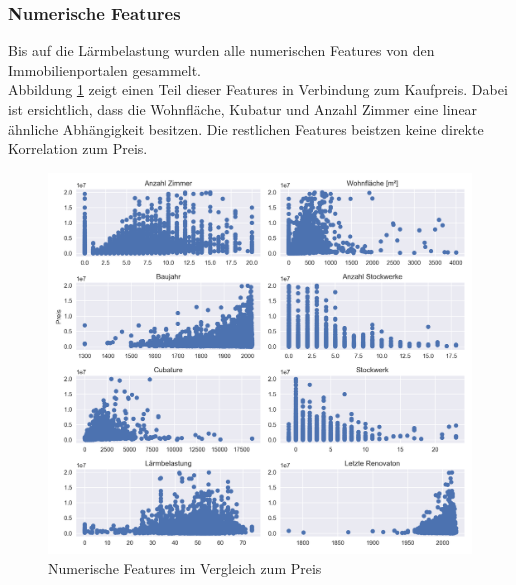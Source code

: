 \begin{table}[ht]
\centering
{}
\caption{Statistische Werte des Kaufpreises}
\label{tab:price}
\end{table}

\subsubsection{Numerische Features}
Bis auf die Lärmbelastung wurden alle numerischen Features von den Immobilienportalen gesammelt.\\
Abbildung \ref{fig:num_features} zeigt einen Teil dieser Features in Verbindung zum Kaufpreis. Dabei ist ersichtlich, dass die Wohnfläche, Kubatur und Anzahl Zimmer eine linear ähnliche Abhängigkeit besitzen. Die restlichen Features beistzen keine direkte Korrelation zum Preis.

\begin{figure}[h]
\centering
\includegraphics[width=\textwidth]{images/Vergleich_zum_preis.png}
\caption[Numerische Features im Vergleich zum Preis]{Numerische Features im Vergleich zum Preis}%
\label{fig:num_features}
\end{figure}


